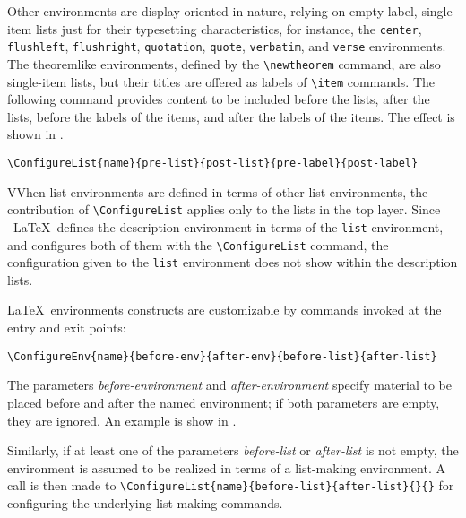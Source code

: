 Other environments are display-oriented in nature, relying on
empty-label, single-item lists just for their typesetting
characteristics, for instance, the \verb|center|, \verb|flushleft|,
\verb|flushright|, \verb|quotation|, \verb|quote|, \verb|verbatim|, and
\verb|verse| environments.  The theoremlike environments, defined by the
\verb|\newtheorem| command, are also single-item lists, but their titles
are offered as labels of \verb|\item| commands.  The following command
provides content to be included before the lists, after the lists,
before the labels of the items, and after the labels of the items. The
effect is shown in . 

 
\begin{lstlisting}
\ConfigureList{name}{pre-list}{post-list}{pre-label}{post-label} 
\end{lstlisting}

VVhen list environments are defined in terms of other list environments,
the contribution of \verb|\ConfigureList| applies only to the lists in
the top layer. Since \ \LaTeX\  defines the description environment in
terms of the \verb|list| environment, and \texht configures both of them
with the \verb|\ConfigureList| command, the configuration given to the
\verb|list| environment does not show within the description lists. 


\LaTeX\  environments constructs are customizable by commands invoked at the entry 
and exit points: 

\begin{lstlisting}
\ConfigureEnv{name}{before-env}{after-env}{before-list}{after-list} 
\end{lstlisting}
 
 
The parameters \emph{before-environment} and \emph{after-environment} specify material
to be placed before and after the named environment; if both parameters
are empty, they are ignored. An example is show in . 

Similarly, if at least one of the parameters \emph{before-list} or
\emph{after-list} is not empty, the environment is assumed to be
realized in terms of a list-making environment.  A call is then made to
\lstinline|\ConfigureList{name}{before-list}{after-list}{}{}| for
configuring the underlying list-making commands. 

